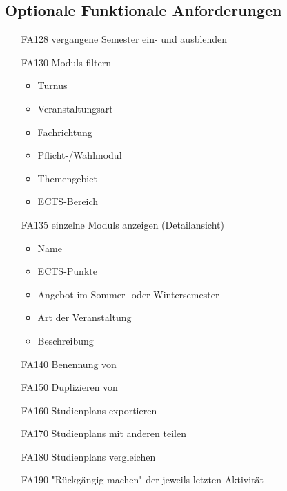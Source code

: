 	\subsection{Optionale  Funktionale Anforderungen}
		\label{subsec:func_requirements-erweitert}
		\begin{itemize}[nosep]
		\item [FA128] vergangene Semester ein- und ausblenden
		\item [FA130] \glspl{Modul} filtern
		\begin{itemize}
		\item Turnus
		\item Veranstaltungsart
		\item Fachrichtung
		\item Pflicht-/Wahlmodul
		\item Themengebiet
		\item ECTS-Bereich
		\end{itemize}
		\item[FA135] einzelne \glspl{Modul} anzeigen (Detailansicht)
			\begin{itemize}[nosep]
						\item Name
						\item \gls{ECTS-Punkte}
						\item Angebot im Sommer- oder Wintersemester
						\item Art der Veranstaltung	
						\item Beschreibung
					\end{itemize}
		\item [FA140]	Benennung von
		\item [FA150] Duplizieren von 
		\item [FA160] \glspl{Studienplan} exportieren
		\item [FA170] \glspl{Studienplan} mit anderen teilen
		\item[FA180] \glspl{Studienplan} vergleichen
		\item [FA190] "Rückgängig machen" der jeweils letzten Aktivität
		\end{itemize}

